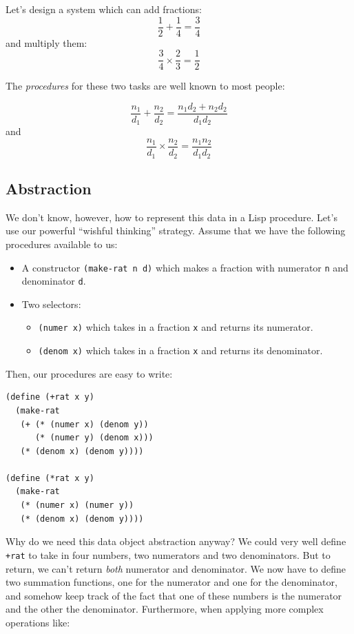 \documentclass[9pt]{report}
\begin{document}
Let's design a system which can add fractions:
$$\frac{1}{2}+\frac{1}{4}=\frac{3}{4}$$
and multiply them:
$$\frac{3}{4}\times \frac{2}{3} = \frac{1}{2}$$

The \emph{procedures} for these two tasks are well known to most people:

$$\frac{n_1}{d_1} + \frac{n_2}{d_2} = \frac{n_1d_2+n_2d_2}{d_1d_2}$$
and
$$\frac{n_1}{d_1} \times \frac{n_2}{d_2} = \frac{n_1n_2}{d_1d_2}$$

\subsection{Abstraction}
\label{sec:orgfd0cecb}
We don't know, however, how to represent this data in a Lisp
procedure. Let's use our powerful ``wishful thinking'' strategy.
Assume that we have the following procedures available to us:

\begin{itemize}
\item A constructor \texttt{(make-rat n d)} which makes a fraction with
numerator \texttt{n} and denominator \texttt{d}.
\item Two selectors:
\begin{itemize}
\item \texttt{(numer x)} which takes in a fraction \texttt{x} and returns its
numerator.
\item \texttt{(denom x)} which takes in a fraction \texttt{x} and returns its
denominator.
\end{itemize}
\end{itemize}

Then, our procedures are easy to write:

\begin{verbatim}
(define (+rat x y)
  (make-rat
   (+ (* (numer x) (denom y))
      (* (numer y) (denom x)))
   (* (denom x) (denom y))))

(define (*rat x y)
  (make-rat
   (* (numer x) (numer y))
   (* (denom x) (denom y))))
\end{verbatim}

Why do we need this data object abstraction anyway? We could very
well define \texttt{+rat} to take in four numbers, two numerators and two
denominators. But to return, we can't return \emph{both} numerator and
denominator. We now have to define two summation functions, one for
the numerator and one for the denominator, and somehow keep track
of the fact that one of these numbers is the numerator and the other
the denominator. Furthermore, when applying more complex operations
like:
\end{document}

